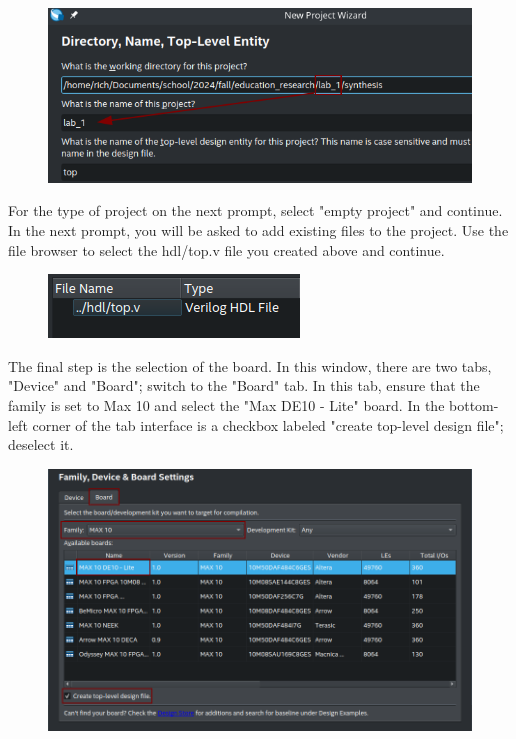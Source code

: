 \documentclass[12pt]{journal}
\begin{document}
\begin{figure}[H]
    \centering
    \includegraphics[width=\columnwidth]{project_settings.png}
\end{figure}

For the type of project on the next prompt, select "empty project" and continue. In the next prompt, you will be asked to add existing files to the project. Use the file browser to select the hdl/top.v file you created above and continue.

\begin{figure}[H]
    \centering
    \includegraphics[width=0.5\linewidth]{addfiles.png}
\end{figure}

The final step is the selection of the board. In this window, there are two tabs, "Device" and "Board"; switch to the "Board" tab. In this tab, ensure that the family is set to Max 10 and select the "Max DE10 - Lite" board. In the bottom-left corner of the tab interface is a checkbox labeled "create top-level design file"; deselect it.

\begin{figure}[H]
    \centering
    \includegraphics[width=\linewidth]{quartus_board.png}
\end{figure}
\end{document}
